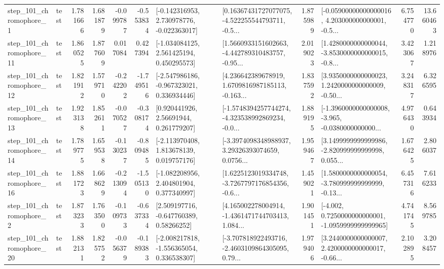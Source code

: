 \begin{tabular}{llrrrrllrlrr}
   step\_101\_chromophore\_1 &      test &      1.781666 &    1.681879 &     -0.099787 & -0.553834 &   [-0.142316953, 2.730978776, -0.022363017] &  [0.16367431727077075, -4.522255544793711, -0.5... &       1.875989 &  [-0.05900000000000016, 4.203000000000001, -0.5... &            6.754770 &         13.660463 \\
  step\_101\_chromophore\_11 &      test &      1.860525 &    1.877609 &      0.017084 &  0.427394 &    [-1.034084125, 2.561425194, 0.450295573] &  [1.5660933151602663, -4.442789310483757, -0.95... &       2.019023 &  [1.4280000000000044, -3.8530000000000015, -0.8... &            3.423067 &          1.218976 \\
  step\_101\_chromophore\_12 &      test &      1.821912 &    1.579710 &     -0.242202 & -1.749516 &   [-2.547986186, -0.967323021, 0.336934446] &  [4.236642389678919, 1.6709816987185113, -0.163... &       1.837592 &  [3.9350000000000023, 1.2420000000000009, -0.50... &            3.248317 &          6.326595 \\
  step\_101\_chromophore\_13 &      test &      1.923138 &    1.852611 &     -0.070527 & -0.308174 &      [0.920441926, 2.56691944, 0.261779207] &  [-1.5748394257744274, -4.323538992869234, -0.0... &       1.889195 &  [-1.3960000000000008, -3.965, -0.0380000000000... &            4.976430 &          0.643934 \\
  step\_101\_chromophore\_14 &      test &      1.789775 &    1.659538 &     -0.130237 & -0.809485 &    [-2.113970408, 1.813678139, 0.019757176] &  [-3.3974098348988937, 3.29326393074659, 0.0756... &       1.959467 &  [3.1499999999999986, -2.820999999999998, 0.055... &            1.676425 &          2.806037 \\
  step\_101\_chromophore\_16 &      test &      1.881723 &    1.668629 &     -0.213094 & -1.505130 &    [-1.082208956, 2.404801904, 0.377340997] &  [1.6225123019334748, -3.7267797176854356, -0.6... &       1.459021 &  [1.5800000000000054, -3.780999999999999, -0.13... &            6.457316 &          7.616233 \\
   step\_101\_chromophore\_2 &      test &      1.873233 &    1.763500 &     -0.109733 & -0.637334 &     [2.509197716, -0.647760389, 0.58266252] &  [4.165002278004914, -1.4361471744703413, 1.084... &       1.901451 &  [-4.002, 0.7250000000000001, -1.0959999999999965] &            4.741745 &          8.569785 \\
  step\_101\_chromophore\_20 &      test &      1.882131 &    1.825752 &     -0.056379 & -0.189383 &   [-2.008217818, -1.556365054, 0.336538307] &  [-3.707818922493716, -2.4603109864305095, 0.79... &       1.979406 &  [3.2440000000000007, 2.4200000000000017, -0.66... &            2.102895 &          3.208457 \\

\end{tabular}
